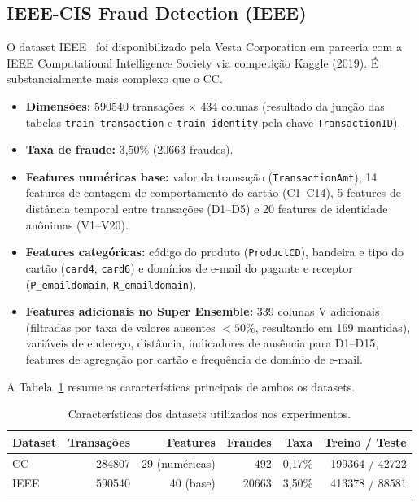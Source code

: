 \documentclass[12pt,a4paper]{article}
\newcommand{\dataset}[1]{\textsc{#1}}
\begin{document}
\subsection{IEEE-CIS Fraud Detection (IEEE)}
\label{sec:dataset-ieee}

O dataset \dataset{IEEE}~\cite{ieee2019kaggle} foi disponibilizado pela Vesta
Corporation em parceria com a IEEE Computational Intelligence Society via
competição Kaggle (2019). É substancialmente mais complexo que o CC.

\begin{itemize}[nosep]
  \item \textbf{Dimensões:} \num{590540} transações $\times$ 434 colunas
    (resultado da junção das tabelas \texttt{train\_transaction} e
    \texttt{train\_identity} pela chave \texttt{TransactionID}).
  \item \textbf{Taxa de fraude:} 3{,}50\% (\num{20663} fraudes).
  \item \textbf{Features numéricas base:} valor da transação (\texttt{TransactionAmt}),
    14 features de contagem de comportamento do cartão (C1--C14), 5 features de
    distância temporal entre transações (D1--D5) e 20 features de identidade
    anônimas (V1--V20).
  \item \textbf{Features categóricas:} código do produto (\texttt{ProductCD}),
    bandeira e tipo do cartão (\texttt{card4}, \texttt{card6}) e domínios de
    e-mail do pagante e receptor (\texttt{P\_emaildomain}, \texttt{R\_emaildomain}).
  \item \textbf{Features adicionais no Super Ensemble:} 339 colunas V adicionais
    (filtradas por taxa de valores ausentes $<50\%$, resultando em 169 mantidas),
    variáveis de endereço, distância, indicadores de ausência para D1--D15,
    features de agregação por cartão e frequência de domínio de e-mail.
\end{itemize}

A Tabela~\ref{tab:datasets} resume as características principais de ambos os
datasets.

\begin{table}[H]
  \centering
  \caption{Características dos datasets utilizados nos experimentos.}
  \label{tab:datasets}
  \begin{tabular}{lrrrrr}
    \toprule
    \textbf{Dataset} & \textbf{Transações} & \textbf{Features} &
    \textbf{Fraudes} & \textbf{Taxa} & \textbf{Treino / Teste} \\
    \midrule
    CC   & \num{284807} & 29 (numéricas) & 492     & 0{,}17\% &
      \num{199364} / \num{42722} \\
    IEEE & \num{590540} & 40 (base)      & \num{20663} & 3{,}50\% &
      \num{413378} / \num{88581} \\
    \bottomrule
  \end{tabular}
\end{table}
\end{document}
